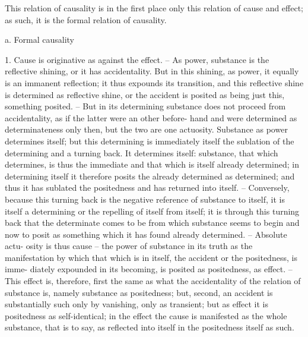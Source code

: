 This relation of causality is in the first place
only this relation of cause and effect;
as such, it is the formal relation of causality.

a. Formal causality

1. Cause is originative as against the effect.
– As power, substance is the
reflective shining, or it has accidentality.
 But in this shining, as power, it
equally is an immanent reflection;
it thus expounds its transition, and this
reflective shine is determined as reflective shine, or the accident is posited
as being just this, something posited.
– But in its determining substance
does not proceed from accidentality, as if the latter were an other before-
hand and were determined as determinateness only then, but the two are
one actuosity. Substance as power determines itself;
 but this determining is
immediately itself the sublation of the determining and a turning back.
It determines itself: substance, that which determines, is thus the immediate
and that which is itself already determined; in determining itself it therefore
posits the already determined as determined; and thus it has sublated the
positedness and has returned into itself.
– Conversely, because this turning
back is the negative reference of substance to itself, it is itself a determining
or the repelling of itself from itself; it is through this turning back that the
determinate comes to be from which substance seems to begin and now to
posit as something which it has found already determined.
 – Absolute actu-
osity is thus cause
– the power of substance in its truth as the manifestation
by which that which is in itself, the accident or the positedness, is imme-
diately expounded in its becoming, is posited as positedness, as effect.
 – This
effect is, therefore, first the same as what the accidentality of the relation
of substance is, namely substance as positedness; but, second, an accident
is substantially such only by vanishing, only as transient; but as effect it
is positedness as self-identical; in the effect the cause is manifested as the
whole substance, that is to say, as reflected into itself in the positedness
itself as such.

